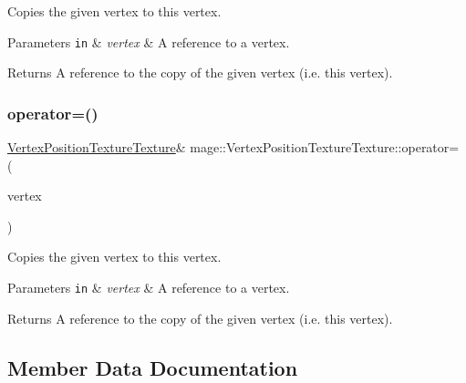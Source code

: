 Copies the given vertex to this vertex.


\begin{DoxyParams}[1]{Parameters}
\mbox{\tt in}  & {\em vertex} & A reference to a vertex. \\
\hline
\end{DoxyParams}
\begin{DoxyReturn}{Returns}
A reference to the copy of the given vertex (i.\+e. this vertex). 
\end{DoxyReturn}
\hypertarget{structmage_1_1_vertex_position_texture_texture_a4e6539fcab28def222ec66a3162b8cd9}{}\label{structmage_1_1_vertex_position_texture_texture_a4e6539fcab28def222ec66a3162b8cd9} 
\subsubsection{\texorpdfstring{operator=()}{operator=()}\hspace{0.1cm}{\footnotesize\ttfamily [2/2]}}
{\footnotesize\ttfamily \hyperlink{structmage_1_1_vertex_position_texture_texture}{Vertex\+Position\+Texture\+Texture}\& mage\+::\+Vertex\+Position\+Texture\+Texture\+::operator= (\begin{DoxyParamCaption}\item[{\hyperlink{structmage_1_1_vertex_position_texture_texture}{Vertex\+Position\+Texture\+Texture} \&\&}]{vertex }\end{DoxyParamCaption})\hspace{0.3cm}{\ttfamily [default]}}

Copies the given vertex to this vertex.


\begin{DoxyParams}[1]{Parameters}
\mbox{\tt in}  & {\em vertex} & A reference to a vertex. \\
\hline
\end{DoxyParams}
\begin{DoxyReturn}{Returns}
A reference to the copy of the given vertex (i.\+e. this vertex). 
\end{DoxyReturn}


\subsection{Member Data Documentation}
\hypertarget{structmage_1_1_vertex_position_texture_texture_a82f271622e34a209d7a3918e7a0190e4}{}\label{structmage_1_1_vertex_position_texture_texture_a82f271622e34a209d7a3918e7a0190e4} 
